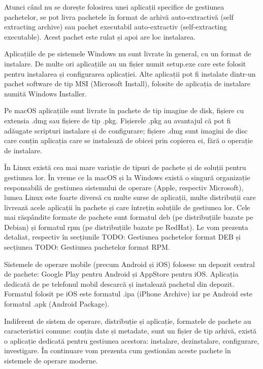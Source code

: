 Atunci când nu se dorește folosirea unei aplicații specifice de gestiunea pachetelor, se pot livra pachetele în format de arhivă auto-extractivă (self extracting archive) sau pachet executabil auto-extractiv (self-extracting executable). Acest pachet este rulat și apoi are loc instalarea.

Aplicațiile de pe sistemele Windows nu sunt livrate în general, cu un format de instalare. De multe ori aplicațiile au un fișier numit setup.exe care este folosit pentru instalarea și configurarea aplicației. Alte aplicații pot fi instalate dintr-un pachet software de tip MSI (Microsoft Install), folosite de aplicația de instalare numită Windows Installer.

Pe macOS aplicațiile sunt livrate în pachete de tip imagine de disk, fișiere cu extensia .dmg sau fișiere de tip .pkg. Fișierele .pkg au avantajul că pot fi adăugate scripturi instalare și de configurare; fișiere .dmg sunt imagini de disc care conțin aplicația care se instalează de obicei prin copierea ei, fără o operație de instalare.

În Linux există cea mai mare variație de tipuri de pachete și de soluții pentru gestiunea lor. În vreme ce la macOS și la Windows există o singură organizație responsabilă de gestiunea sistemului de operare (Apple, respectiv Microsoft), lumea Linux este foarte diversă cu multe surse de aplicații, multe distribuții care livrează acele aplicații în pachete și care întrețin soluțiile de gestiunea lor. Cele mai răspândite formate de pachete sunt formatul deb (pe distribuțiile bazate pe Debian) și formatul rpm (pe distribuțiile bazate pe RedHat). Le vom prezenta detaliat, respectiv în secțiunile TODO: Gestiunea pachetelor format DEB și secțiunea TODO: Gestiunea pachetelor format RPM.

Sistemele de operare mobile (precum Android și iOS) folosesc un depozit central de pachete: Google Play pentru Android și AppStore pentru iOS. Aplicația dedicată de pe telefonul mobil descarcă și instalează pachetul din depozit. Formatul folosit pe iOS este formatul .ipa (iPhone Archive) iar pe Android este formatul .apk (Android Package).

Indiferent de sistem de operare, distribuție și aplicație, formatele de pachete au caracteristici comune: conțin date și metadate, sunt un fișier de tip arhivă, există o aplicație dedicată pentru gestiunea acestora: instalare, dezinstalare, configurare, investigare. În continuare vom prezenta cum gestionăm aceste pachete în sistemele de operare moderne.

